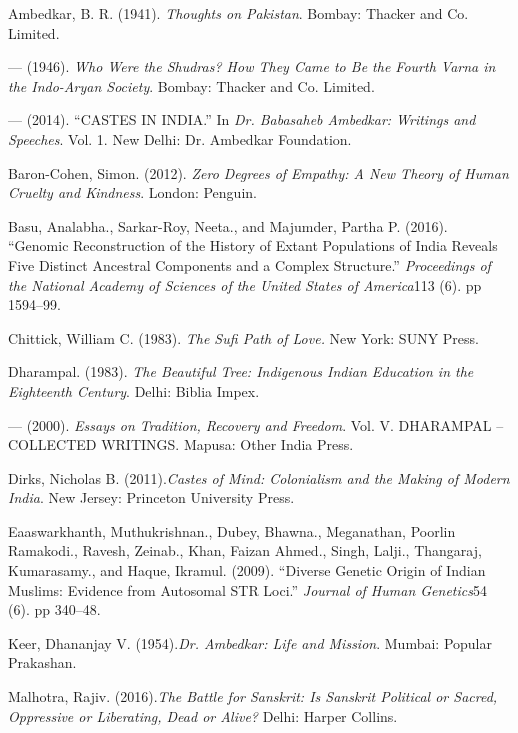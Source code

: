 \begin{thebibliography}{99}
\itemsep=0pt
 Ambedkar, B. R. (1941). \textit{Thoughts on Pakistan}. Bombay: Thacker and Co. Limited.

  --- (1946). \textit{Who Were the Shudras? How They Came to Be the Fourth Varna in the Indo-Aryan Society}. Bombay: Thacker and Co. Limited.

  --- (2014). “CASTES IN INDIA.” In \textit{Dr. Babasaheb Ambedkar: Writings and Speeches}. Vol. 1. New Delhi: Dr. Ambedkar Foundation.

  Baron-Cohen, Simon. (2012). \textit{Zero Degrees of Empathy: A New Theory of Human Cruelty and Kindness}. London: Penguin.

  Basu, Analabha., Sarkar-Roy, Neeta., and Majumder, Partha P. (2016). “Genomic Reconstruction of the History of Extant Populations of India Reveals Five Distinct Ancestral Components and a Complex Structure.” \textit{Proceedings of the National Academy of Sciences of the United States of America}113 (6). pp 1594–99.

  Chittick, William C. (1983). \textit{The Sufi Path of Love.} New York: SUNY Press.

  Dharampal. (1983). \textit{The Beautiful Tree: Indigenous Indian Education in the Eighteenth Century}. Delhi: Biblia Impex.

  --- (2000). \textit{Essays on Tradition, Recovery and Freedom}. Vol. V. DHARAMPAL – COLLECTED WRITINGS. Mapusa: Other India Press.

  Dirks, Nicholas B. (2011).\textit{Castes of Mind: Colonialism and the Making of Modern India}. New Jersey: Princeton University Press.

  Eaaswarkhanth, Muthukrishnan., Dubey, Bhawna., Meganathan, Poorlin Ramakodi., Ravesh, Zeinab., Khan, Faizan Ahmed., Singh, Lalji., Thangaraj, Kumarasamy., and Haque, Ikramul. (2009). “Diverse Genetic Origin of Indian Muslims: Evidence from Autosomal STR Loci.” \textit{Journal of Human Genetics}54 (6). pp 340–48.

  Keer, Dhananjay V. (1954).\textit{Dr. Ambedkar: Life and Mission}. Mumbai: Popular Prakashan.

  Malhotra, Rajiv. (2016).\textit{The Battle for Sanskrit: Is Sanskrit Political or Sacred, Oppressive or Liberating, Dead or Alive?} Delhi: Harper Collins.


\end{thebibliography}
